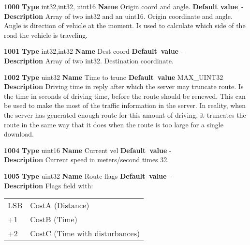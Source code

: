 \documentclass[a4paper]{article}
\begin{document}
\begin{list}{\textbf{ParamID}}{}
\item \textbf{1000} \textbf{Type} int32,int32, uint16 
  \textbf{Name} Origin coord and angle. \textbf{Default value}~-\\
  \label{Origin coord and angle}
  \textbf{Description} Array of two int32 and an uint16. Origin coordinate and
  angle. Angle is direction of vehicle at the moment. Is used to calculate
  which side of the road the vehicle is traveling.
\item \textbf{1001} \textbf{Type} int32,int32 \textbf{Name} Dest coord
                 \textbf{Default~value} - \\
  \label{Dest coord}
  \textbf{Description} Array of two int32. Destination coordinate.
\item \textbf{1002} \textbf{Type} uint32 \textbf{Name} Time to trunc
                 \textbf{Default~value} MAX\_UINT32 \\
  \label{Time to trunc}
  \textbf{Description} Driving time in reply after which the server may
  truncate route. Is the time in seconds of driving time, before the
  route should be renewed. This can be used to make the most of the
  traffic information in the server. In reality, when the server has
  generated enough route for this amount of driving, it truncates the
  route in the same way that it does when the route is too large for a
  single download.
\item \textbf{1004} \textbf{Type} uint16 \textbf{Name} Current vel 
                 \textbf{Default~value} - \\
  \label{Current vel}
  \textbf{Description} Current speed in meters/second times 32.
\item \textbf{1005} \textbf{Type} uint32 \textbf{Name} Route flags
                 \textbf{Default~value} - \\
  \label{Route flags}
  \textbf{Description} Flags field with:\\
    \begin{tabular}{ll}
      LSB & CostA (Distance)               \\
      +1  & CostB (Time)                   \\
      +2  & CostC (Time with disturbances) \\

\end{tabular}
\end{list}
\end{document}
